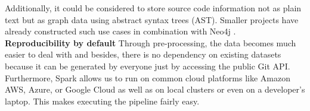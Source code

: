 Additionally, it could be considered to store source code information not as plain text but as graph data using abstract syntax trees (AST). Smaller projects have already constructed such use cases in combination with Neo4j \cite{Arora2019}.\\
\textbf{Reproducibility by default} Through pre-processing, the data becomes much easier to deal with and besides, there is no dependency on existing datasets because it can be generated by everyone just by accessing the public Git API. Furthermore, Spark allows us to run on common cloud platforms like Amazon AWS, Azure, or Google Cloud as well as on local clusters or even on a developer's laptop. This makes executing the pipeline fairly easy. 